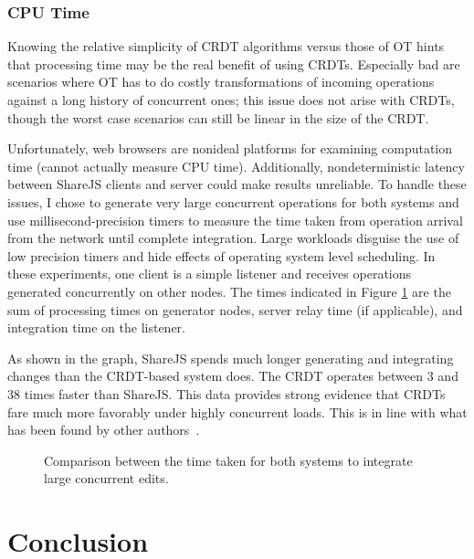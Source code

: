 \documentclass[12pt,a4paper,twoside,openright]{report}
\begin{document}
		
	
		\subsection{CPU Time}
			Knowing the relative simplicity of CRDT algorithms versus those of OT hints that processing time may be the real benefit of using CRDTs. Especially bad are scenarios where OT has to do costly transformations of incoming operations against a long history of concurrent ones; this issue does not arise with CRDTs, though the worst case scenarios can still be linear in the size of the CRDT.
			
			Unfortunately, web browsers are nonideal platforms for examining computation time (cannot actually measure CPU time). Additionally, nondeterministic latency between ShareJS clients and server could make results unreliable. To handle these issues, I chose to generate very large concurrent operations for both systems and use millisecond-precision timers to measure the time taken from operation arrival from the network until complete integration. Large workloads disguise the use of low precision timers and hide effects of operating system level scheduling. In these experiments, one client is a simple listener and receives operations generated concurrently on other nodes. The times indicated in Figure \ref{fig:cputime} are the sum of processing times on generator nodes, server relay time (if applicable), and integration time on the listener.
			
			As shown in the graph, ShareJS spends much longer generating and integrating changes than the CRDT-based system does. The CRDT operates between 3 and 38 times faster than ShareJS. This data provides strong evidence that CRDTs fare much more favorably under highly concurrent loads. This is in line with what has been found by other authors~\cite{ahmed2011evaluating}.
			
			\begin{figure}[htb]
				\centering
				
				\caption[CPU Time] {Comparison between the time taken for both systems to integrate large concurrent edits.}
				\label{fig:cputime}
			\end{figure}		
	
		
		
		
		
		
		


\chapter{Conclusion}
\end{document}
